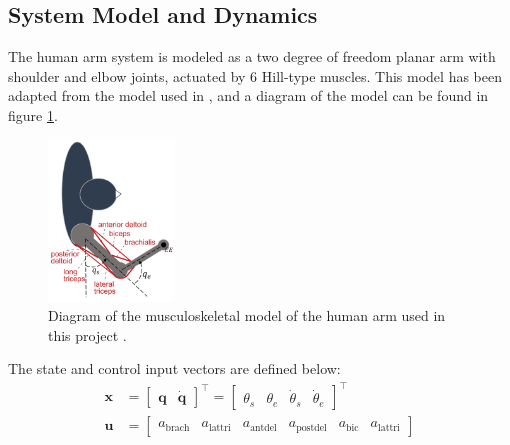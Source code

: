\documentclass[letterpaper, 10pt, conference]{ieeeconf}
\begin{document}
\subsection{System Model and Dynamics}
The human arm system is modeled as a two degree of freedom planar arm with shoulder and elbow joints, actuated by 6 Hill-type muscles. This model has been adapted from the model used in \cite{c7}, and a diagram of the model can be found in figure \ref{fig:arm_model}. 

\begin{figure}[h]
    \centering
    \includegraphics[width=0.3\textwidth]{arm_model_diagram.png}
    \caption{Diagram of the musculoskeletal model of the human arm used in this project \cite{c7}.}
    \label{fig:arm_model}
\end{figure}

The state and control input vectors are defined below:
\begin{align}
    \mathbf{x} &= \begin{bmatrix}
        \mathbf{q} &
        \dot{\mathbf{q}}
    \end{bmatrix}^\top = \begin{bmatrix}
        \theta_s &
        \theta_e &
        \dot{\theta}_s &
        \dot{\theta}_e
    \end{bmatrix}^\top \\
    \mathbf{u} &= \begin{bmatrix}
        a_{\text{brach}} & a_{\text{lattri}} & a_{\text{antdel}} & a_{\text{postdel}} & a_{\text{bic}} & a_{\text{lattri}}
    \end{bmatrix}
\end{align}
\end{document}
